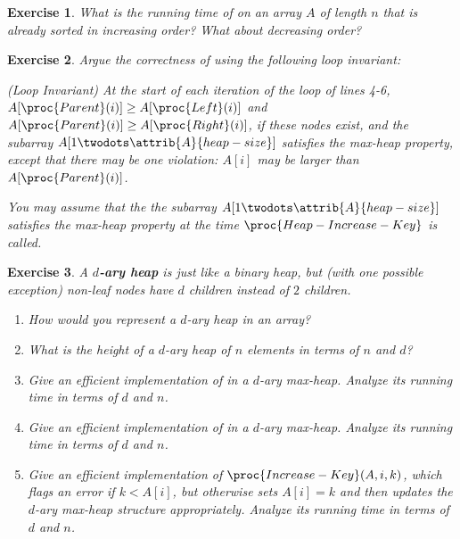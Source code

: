\documentclass[11pt]{amsart}
\theoremstyle{theorem}
\newtheorem{exercise}{Exercise}
\begin{document}
\begin{exercise}
What is the running time of  on an array $A$ of length $n$ that is already sorted in increasing order? What about decreasing order?
\end{exercise}

\begin{exercise}
Argue the correctness of  using the following loop invariant:
\begin{displayquote}
(Loop Invariant) At the start of each iteration of the \While loop of lines 4-6, $A[\proc{Parent}(i)]\geq A[\proc{Left}(i)]$ and $A[\proc{Parent}(i)]\geq A[\proc{Right}(i)]$, if these nodes exist, and the subarray $A[1\twodots \attrib{A}{heap-size}]$ satisfies the max-heap property, except that there may be one violation: $A[i]$ may be larger than $A[\proc{Parent}(i)]$.
\end{displayquote}
You may assume that the the subarray $A[1\twodots \attrib{A}{heap-size}]$ satisfies the max-heap property at the time $\proc{Heap-Increase-Key}$ is called.
\end{exercise}


\begin{exercise}
A \textbf{$d$-ary heap}  is just like a binary heap, but (with one possible exception) non-leaf nodes have $d$ children instead of $2$ children.
\begin{enumerate}
\item How would you represent a $d$-ary heap in an array?
\item What is the height of a $d$-ary heap of $n$ elements in terms of $n$ and $d$?
\item Give an efficient implementation of  in a $d$-ary max-heap. Analyze its running time in terms of $d$ and $n$.
\item Give an efficient implementation of  in a $d$-ary max-heap. Analyze its running time in terms of $d$ and $n$.
\item Give an efficient implementation of $\proc{Increase-Key}(A,i,k)$, which flags an error if $k<A[i]$, but otherwise sets $A[i]=k$ and then updates the $d$-ary max-heap structure appropriately. Analyze its running time in terms of $d$ and $n$.
\end{enumerate}
\end{exercise}
\end{document}
